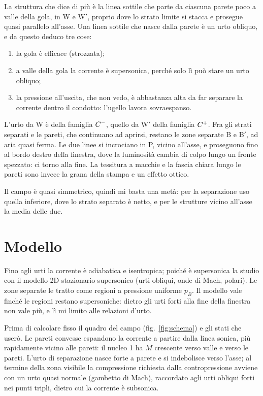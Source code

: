 La struttura che dice di più è la linea sottile che parte da ciascuna parete poco a valle della gola, in W e W$'$,
proprio dove lo strato limite si stacca e prosegue quasi parallelo all'asse. Una linea sottile che nasce dalla
parete è un urto obliquo, e da questo deduco tre cose:
\begin{enumerate}[label=(\alph*)]
\item la gola è efficace (strozzata);
\item a valle della gola la corrente è supersonica, perché solo lì può stare un urto obliquo;
\item la pressione all'uscita, che non vedo, è abbastanza alta da far separare la corrente dentro il condotto:
  l'ugello lavora sovraespanso.
\end{enumerate}
L'urto da W è della famiglia $C^{-}$, quello da W$'$ della famiglia $C^{+}$. Fra gli strati separati e le pareti, che
continuano ad aprirsi, restano le zone separate B e B$'$, ad aria quasi ferma. Le due linee si incrociano in P,
vicino all'asse, e proseguono fino al bordo destro della finestra, dove la luminosità cambia di colpo lungo un fronte
spezzato: ci torno alla fine. La tessitura a macchie e la fascia chiara lungo le pareti sono invece la grana della
stampa e un effetto ottico.

Il campo è quasi simmetrico, quindi mi basta una metà: per la separazione uso quella inferiore, dove lo strato
separato è netto, e per le strutture vicino all'asse la media delle due.

\section*{Modello}
Fino agli urti la corrente è adiabatica e isentropica; poiché è supersonica la studio con il modello 2D stazionario
supersonico (urti obliqui, onde di Mach, polari). Le zone separate le tratto come regioni a pressione uniforme
$p_B$. Il modello vale finché le regioni restano supersoniche: dietro gli urti forti alla fine della finestra non
vale più, e lì mi limito alle relazioni d'urto.

Prima di calcolare fisso il quadro del campo (fig.~\ref{fig:schema}) e gli stati che userò. Le pareti convesse
espandono la corrente a partire dalla linea sonica, più rapidamente vicino alle pareti: il nucleo 1 ha $M$ crescente
verso valle e verso le pareti. L'urto di separazione nasce forte a parete e si indebolisce verso l'asse; al termine
della zona visibile la compressione richiesta dalla contropressione avviene con un urto quasi normale (gambetto di
Mach), raccordato agli urti obliqui forti nei punti tripli, dietro cui la corrente è subsonica.

